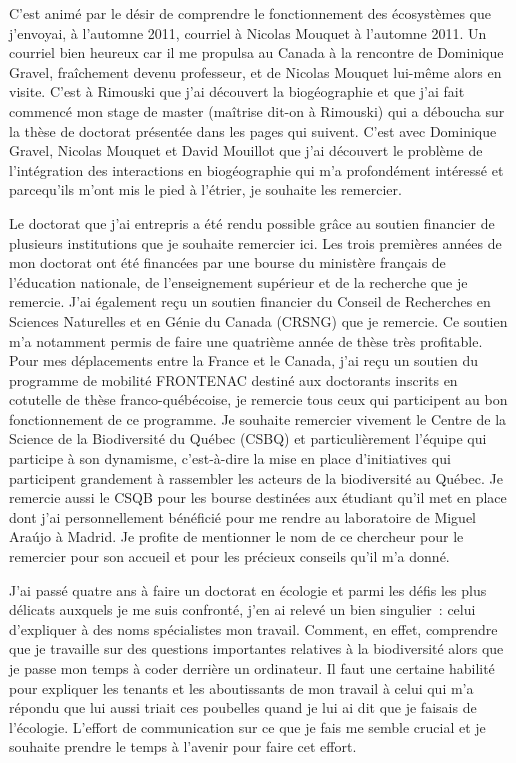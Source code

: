 C'est animé par le désir de comprendre le fonctionnement des écosystèmes
que j'envoyai, à l'automne 2011, courriel à Nicolas Mouquet à l'automne
2011. Un courriel bien heureux car il me propulsa au Canada à la
rencontre de Dominique Gravel, fraîchement devenu professeur, et de
Nicolas Mouquet lui-même alors en visite. C'est à Rimouski que j'ai
découvert la biogéographie et que j'ai fait commencé mon stage de master
(maîtrise dit-on à Rimouski) qui a déboucha sur la thèse de doctorat
présentée dans les pages qui suivent. C'est avec Dominique Gravel,
Nicolas Mouquet et David Mouillot que j'ai découvert le problème de
l'intégration des interactions en biogéographie qui m'a profondément
intéressé et parcequ'ils m'ont mis le pied à l'étrier, je souhaite les
remercier.

Le doctorat que j'ai entrepris a été rendu possible grâce au soutien
financier de plusieurs institutions que je souhaite remercier ici. Les
trois premières années de mon doctorat ont été financées par une bourse
du ministère français de l'éducation nationale, de l'enseignement
supérieur et de la recherche que je remercie. J'ai également reçu un
soutien financier du Conseil de Recherches en Sciences Naturelles et en
Génie du Canada (CRSNG) que je remercie. Ce soutien m'a notamment permis
de faire une quatrième année de thèse très profitable. Pour mes
déplacements entre la France et le Canada, j'ai reçu un soutien du
programme de mobilité FRONTENAC destiné aux doctorants inscrits en
cotutelle de thèse franco-québécoise, je remercie tous ceux qui
participent au bon fonctionnement de ce programme. Je souhaite remercier
vivement le Centre de la Science de la Biodiversité du Québec (CSBQ) et
particulièrement l'équipe qui participe à son dynamisme, c'est-à-dire la
mise en place d'initiatives qui participent grandement à rassembler les
acteurs de la biodiversité au Québec. Je remercie aussi le CSQB pour les
bourse destinées aux étudiant qu'il met en place dont j'ai
personnellement bénéficié pour me rendre au laboratoire de Miguel Araújo
à Madrid. Je profite de mentionner le nom de ce chercheur pour le
remercier pour son accueil et pour les précieux conseils qu'il m'a
donné.

J'ai passé quatre ans à faire un doctorat en écologie et parmi les défis
les plus délicats auxquels je me suis confronté, j'en ai relevé un bien
singulier~: celui d'expliquer à des noms spécialistes mon travail.
Comment, en effet, comprendre que je travaille sur des questions
importantes relatives à la biodiversité alors que je passe mon temps à
coder derrière un ordinateur. Il faut une certaine habilité pour
expliquer les tenants et les aboutissants de mon travail à celui qui m'a
répondu que lui aussi triait ces poubelles quand je lui ai dit que je
faisais de l'écologie. L'effort de communication sur ce que je fais me
semble crucial et je souhaite prendre le temps à l'avenir pour faire cet
effort.

